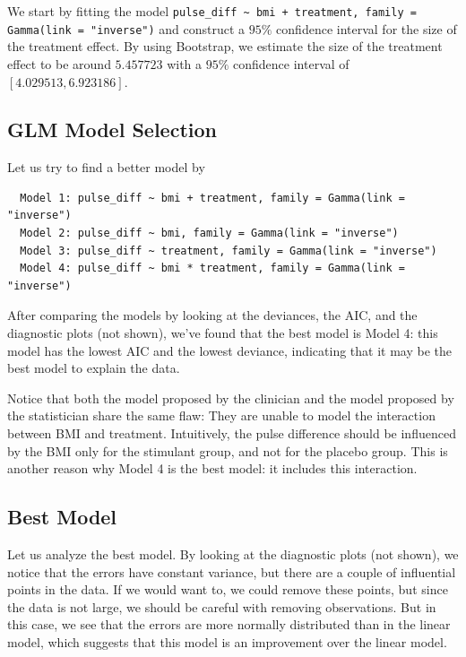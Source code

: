 \documentclass[10pt, a4paper]{article}
\begin{document}
We start by fitting the model \verb|pulse_diff ~ bmi + treatment, family = Gamma(link = "inverse")| and construct a $95 \%$ confidence interval for the size of the treatment effect. By using Bootstrap, we estimate the size of the treatment effect to be around $5.457723$ with a $95 \%$ confidence interval of $[4.029513, 6.923186]$.

\subsection{GLM Model Selection}

Let us try to find a better model by
\begin{lstlisting}
  Model 1: pulse_diff ~ bmi + treatment, family = Gamma(link = "inverse")
  Model 2: pulse_diff ~ bmi, family = Gamma(link = "inverse")
  Model 3: pulse_diff ~ treatment, family = Gamma(link = "inverse")
  Model 4: pulse_diff ~ bmi * treatment, family = Gamma(link = "inverse")
\end{lstlisting}
After comparing the models by looking at the deviances, the AIC, and the diagnostic plots (not shown), we've found that the best model is Model 4: this model has the lowest AIC and the lowest deviance, indicating that it may be the best model to explain the data. 

Notice that both the model proposed by the clinician and the model proposed by the statistician share the same flaw: They are unable to model the interaction between BMI and treatment. Intuitively, the pulse difference should be influenced by the BMI only for the stimulant group, and not for the placebo group. This is another reason why Model 4 is the best model: it includes this interaction.

\subsection{Best Model}

Let us analyze the best model. By looking at the diagnostic plots (not shown), we notice that the errors have constant variance, but there are a couple of influential points in the data. If we would want to, we could remove these points, but since the data is not large, we should be careful with removing observations. But in this case, we see that the errors are more normally distributed than in the linear model, which suggests that this model is an improvement over the linear model.
\end{document}
